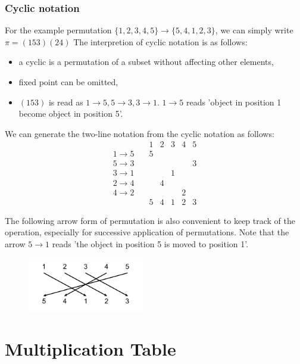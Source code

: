 \documentclass{amsart}
\theoremstyle{remark}
\theoremstyle{remark}
\theoremstyle{definition}
\begin{document}
\subsubsection*{Cyclic notation}
For the example permutation $\{1,2,3,4,5\} \to \{ 5,4,1,2,3 \}$, we can simply write
$\pi = (153)(24)$
The interpretion of cyclic notation is as follows:
\begin{itemize}
    \item a cyclic is a permutation of a subset without affecting other elements,
    \item fixed point can be omitted,
    \item $(153)$ is read as $1\to 5, 5\to 3, 3\to 1$. $1\to5$ reads 'object in position 1 become object in position 5'.
\end{itemize}
We can generate the two-line notation from the cyclic notation as follows:
\begin{equation*}
    \begin{matrix}
                & 1 & 2 & 3 & 4 & 5 \\
        1 \to 5 \quad & 5 &   &   &   &   \\
        5 \to 3 \quad &   &   &   &   & 3 \\
        3 \to 1 \quad &   &   & 1 &   &   \\
        2 \to 4 \quad &   & 4 &   &   &   \\
        4 \to 2 \quad &   &   &   & 2 &   \\
                & 5 & 4 & 1 & 2 & 3
    \end{matrix}
\end{equation*}

The following arrow form of permutation is also convenient to keep track of the operation, especially for successive 
application of permutations. Note that the arrow $5\to1$ reads 'the object in position 5 is moved to position 1'.
\begin{figure}[!h]
    \centering
    \includegraphics[width=2in]{figures/permutation_arrow.png}
\end{figure}

\vspace{10pt}
\section*{Multiplication Table}
\end{document}
